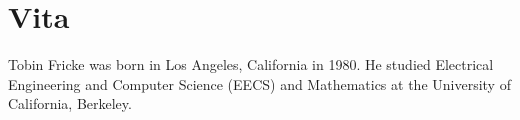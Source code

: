 \chapter*{Vita}

Tobin Fricke was born in Los Angeles, California in 1980.  He studied
Electrical Engineering and Computer Science (EECS) and Mathematics at
the University of California, Berkeley.
